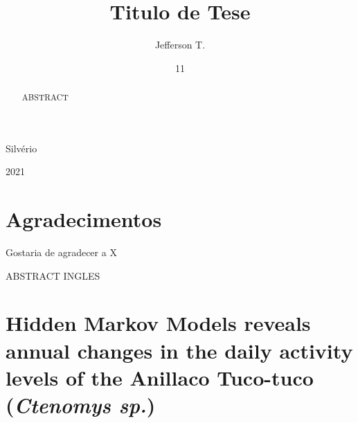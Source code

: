 \documentclass[english,msc,numbers,hidelinks]{coppe}
\begin{document}
  \title{Titulo de Tese}
    \author{Jefferson T.}{Silvério}
  

  \date{11}{2021}
    
  \maketitle

  \frontmatter
  
  \dedication{A alguém cujo valor é digno desta dedicatória.}
    \chapter*{Agradecimentos}
  Gostaria de agradecer a X
  
  \begin{abstract}
  ABSTRACT
  \end{abstract}
  \pagebreak
  \begin{foreignabstract}
  ABSTRACT INGLES
  \end{foreignabstract}
  \tableofcontents
  
    \listoffigures
  
    \listoftables
  
  \printlosymbols
  \printloabbreviations

  \mainmatter
  \hypertarget{hidden-markov-models-reveals-annual-changes-in-the-daily-activity-levels-of-the-anillaco-tuco-tuco-ctenomys-sp.}{%
  \chapter{\texorpdfstring{Hidden Markov Models reveals annual changes in the daily activity levels of the Anillaco Tuco-tuco (\emph{Ctenomys sp.})}{Hidden Markov Models reveals annual changes in the daily activity levels of the Anillaco Tuco-tuco (Ctenomys sp.)}}\label{hidden-markov-models-reveals-annual-changes-in-the-daily-activity-levels-of-the-anillaco-tuco-tuco-ctenomys-sp.}}
\end{document}
